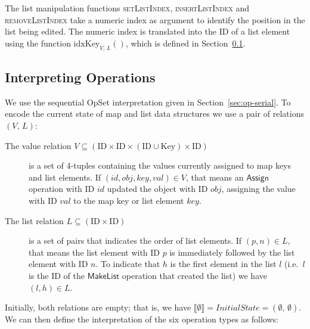 The list manipulation functions \textsc{setListIndex}, \textsc{insertListIndex} and \textsc{removeListIndex} take a numeric index as argument to identify the position in the list being edited.
The numeric index is translated into the ID of a list element using the function $\mathrm{idxKey}_{V,\, L}()$, which is defined in Section~\ref{sec:datatypes-interp}.

\subsection{Interpreting Operations}\label{sec:datatypes-interp}

We use the sequential OpSet interpretation given in Section~\ref{sec:op-serial}.
To encode the current state of map and list data structures we use a pair of relations $(V,\, L)$:
\begin{description}
    \item[The value relation $V \subseteq (\mathrm{ID} \times \mathrm{ID} \times (\mathrm{ID} \cup \mathrm{Key}) \times \mathrm{ID})$]
        is a set of 4-tuples containing the values currently assigned to map keys and list elements.
        If $(\mathit{id}, \mathit{obj}, \mathit{key}, \mathit{val}) \in V$, that means an $\mathsf{Assign}$ operation with ID $\mathit{id}$ updated the object with ID $\mathit{obj}$, assigning the value with ID $\mathit{val}$ to the map key or list element $\mathit{key}$.
    \item[The list relation $L \subseteq (\mathrm{ID} \times \mathrm{ID})$] is a set of pairs that indicates the order of list elements.
        If $(p,n) \in L$, that means the list element with ID $p$ is immediately followed by the list element with ID $n$.
        To indicate that $h$ is the first element in the list $l$ (i.e.\ $l$ is the ID of the $\mathsf{MakeList}$ operation that created the list) we have $(l,h) \in L$.
\end{description}
Initially, both relations are empty; that is, we have $\llbracket\emptyset\rrbracket = \mathit{InitialState} = (\emptyset,\, \emptyset)$.
We can then define the interpretation of the six operation types as follows:

